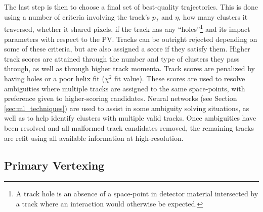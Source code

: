             The last step is then to choose a final set of best-quality trajectories.
            This is done using a number of criteria involving
                the track's $p_T$ and $\eta$,
                how many clusters it traversed, 
                whether it shared pixels,
                if the track has any ``holes''\footnote{
                    A track hole is an absence of a space-point in detector material intersected by a track
                    where an interaction would otherwise be expected.}
                and its impact parameters with respect to the PV\cite{atlas_track_reco_performance}.
            Tracks can be outright rejected depending on some of these criteria,
                but are also assigned a score if they satisfy them.
            Higher track scores are attained through the number and type of clusters they pass through,
                as well as through higher track momenta.
            Track scores are penalized by having holes or a poor helix fit ($\chi^2$ fit value).
            These scores are used to resolve ambiguities where multiple tracks are assigned to the same space-points,
                with preference given to higher-scoring candidates.
            Neural networks (see Section \ref{sec:ml_techniques})
                are used to assist in some ambiguity solving situations,
                as well as to help identify clusters with multiple valid tracks.
            Once ambiguities have been resolved and all malformed track candidates removed,
                the remaining tracks are refit using all available information at high-resolution\cite{atlas_track_reco_performance}.

        \FloatBarrier
        \subsection{Primary Vertexing}

